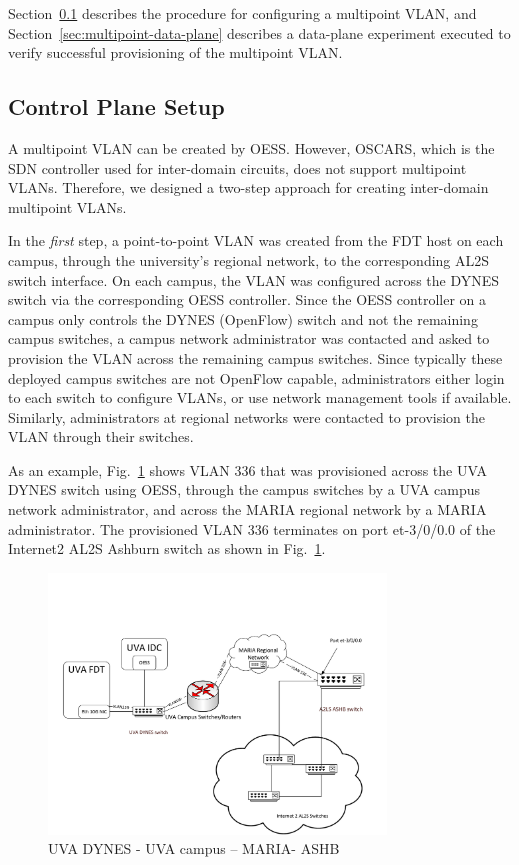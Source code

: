 
Section~\ref{sec:multipoint-control-plane} describes the procedure
for configuring a multipoint VLAN, and Section~\ref{sec:multipoint-data-plane}
describes a data-plane experiment executed to verify successful provisioning
of the multipoint VLAN.

\subsection{Control Plane Setup}
\label{sec:multipoint-control-plane}

A multipoint VLAN can be created by OESS. However, OSCARS, which is the SDN controller
used for inter-domain circuits, does not support multipoint VLANs. Therefore, we designed
a two-step approach for creating inter-domain multipoint VLANs.

In the \emph{first} step, a point-to-point VLAN was created from the FDT host on each campus, through
the university's regional network, to the corresponding AL2S switch interface. On each campus, the VLAN was configured across the DYNES switch via the corresponding OESS controller. Since
the OESS controller on a campus only controls the DYNES (OpenFlow) switch
and not the remaining campus switches, a campus network administrator was contacted
and asked to provision the VLAN across the remaining campus switches. Since typically
these deployed campus switches are not OpenFlow capable, administrators
either login to each switch to configure VLANs, or use network management tools if available. Similarly, administrators at regional networks were contacted to provision the VLAN through
their switches.

As an example, Fig.~\ref{fig:UVA-VLAN336} shows VLAN 336 that
was provisioned across the UVA DYNES switch using OESS, through the campus switches by
a UVA campus network administrator, and across the MARIA regional network by a MARIA
administrator. The provisioned VLAN 336 terminates on port et-3/0/0.0 of the Internet2 AL2S Ashburn switch as shown in Fig.~\ref{fig:UVA-VLAN336}.
\begin{figure}[htb!]
\centering
\includegraphics[width=0.8\textwidth]{figures/UVA-ASHB.pdf}
\caption{UVA DYNES - UVA campus – MARIA- ASHB}
\label{fig:UVA-VLAN336}
\end{figure}

